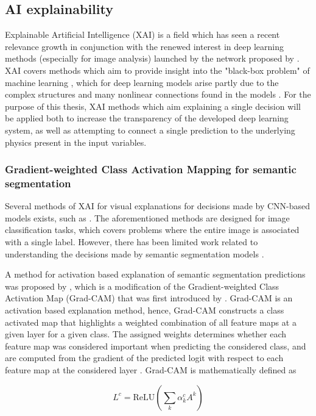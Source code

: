\documentclass[../main/thesis.tex]{subfiles}
\begin{document}
\subsection{AI explainability}
Explainable Artificial Intelligence (XAI) is a field which has seen a recent relevance growth in conjunction with the renewed interest in deep learning methods (especially for image analysis) launched by the network proposed by \citet{Krizhevsky2012}. XAI covers methods which aim to provide insight into the "black-box problem" of machine learning \citep{Adadi2018}, which for deep learning models arise partly due to the complex structures and many nonlinear connections found in the models \citep{Lopes2022}. For the purpose of this thesis, XAI methods which aim explaining a single decision will be applied both to increase the transparency of the developed deep learning system, as well as attempting to connect a single prediction to the underlying physics present in the input variables.

\subsubsection{Gradient-weighted Class Activation Mapping for semantic segmentation}
Several methods of XAI for visual explanations for decisions made by CNN-based models exists, such as \citep{Simonyan2013,Zhou2016,Selvaraju2016,Sundararajan2017,Lundberg2017}. The aforementioned methods are designed for image classification tasks, which covers problems where the entire image is associated with a single label. However, there has been limited work related to understanding the decisions made by semantic segmentation models \citep{Linardatos2020}.

A method for activation based explanation of semantic segmentation predictions was proposed by \citet{Vinogradova2020}, which is a modification of the Gradient-weighted Class Activation Map (Grad-CAM) that was first introduced by \citet{Selvaraju2016}. Grad-CAM is an activation based explanation method, hence, Grad-CAM constructs a class activated map that highlights a weighted combination of all feature maps at a given layer for a given class. The assigned weights determines whether each feature map was considered important when predicting the considered class, and are computed from the gradient of the predicted logit with respect to each feature map at the considered layer \citep{Selvaraju2016}. Grad-CAM is mathematically defined as

\begin{equation}
    \label{eq:gradcam}
    L^c = \text{ReLU}\left(\sum_k \alpha_k^c A^k\right)    
\end{equation}
\end{document}

